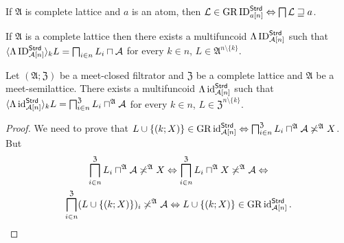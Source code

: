 \begin{obvious}
If $\mathfrak{A}$ is complete lattice and $a$ is an atom, then $\mathcal{L}\in\operatorname{GR}\operatorname{ID}_{a[n]}^{\mathsf{Strd}}\Leftrightarrow\bigsqcap\mathcal{L}\sqsupseteq a$.
\end{obvious}

\begin{obvious}
If $\mathfrak{A}$ is a complete lattice then there exists a multifuncoid
$\Lambda\operatorname{ID}_{\mathcal{A}[n]}^{\mathsf{Strd}}$ such that $\langle\Lambda\operatorname{ID}_{\mathcal{A}[n]}^{\mathsf{Strd}}\rangle_{k}L=\bigsqcap_{i\in n}L_{i}\sqcap\mathcal{A}$
for every $k\in n$, $L\in\mathfrak{A}^{n\setminus\{k\}}$.\end{obvious}
\begin{prop}
Let $(\mathfrak{A};\mathfrak{Z})$ be a meet-closed filtrator and $\mathfrak{Z}$
be a complete lattice and $\mathfrak{A}$ be a meet-semilattice. There
exists a multifuncoid $\Lambda\operatorname{id}_{\mathcal{A}[n]}^{\mathsf{Strd}}$
such that $\langle\Lambda\operatorname{id}_{\mathcal{A}[n]}^{\mathsf{Strd}}\rangle_{k}L=\bigsqcap_{i\in n}^{\mathfrak{Z}}L_{i}\sqcap^{\mathfrak{A}}\mathcal{A}$
for every $k\in n$, $L\in\mathfrak{Z}^{n\setminus\{k\}}$.\end{prop}
\begin{proof}
We need to prove that $L\cup\{(k;X)\}\in\operatorname{GR}\operatorname{id}_{\mathcal{A}[n]}^{\mathsf{Strd}}\Leftrightarrow\bigsqcap_{i\in n}^{\mathfrak{Z}}L_{i}\sqcap^{\mathfrak{A}}\mathcal{A}\not\asymp^{\mathfrak{A}}X$.
But
\begin{multline*}
\bigsqcap_{i\in n}^{\mathfrak{Z}}L_{i}\sqcap^{\mathfrak{A}}\mathcal{A}\not\asymp^{\mathfrak{A}}X\Leftrightarrow\bigsqcap_{i\in n}^{\mathfrak{Z}}L_{i}\sqcap^{\mathfrak{A}}X\not\asymp^{\mathfrak{A}}\mathcal{A}\Leftrightarrow\\
\bigsqcap_{i\in n}^{\mathfrak{Z}}(L\cup\{(k;X)\})_{i}\not\asymp^{\mathfrak{A}}\mathcal{A}\Leftrightarrow L\cup\{(k;X)\}\in\operatorname{GR}\operatorname{id}_{\mathcal{A}[n]}^{\mathsf{Strd}}.
\end{multline*}

\end{proof}

